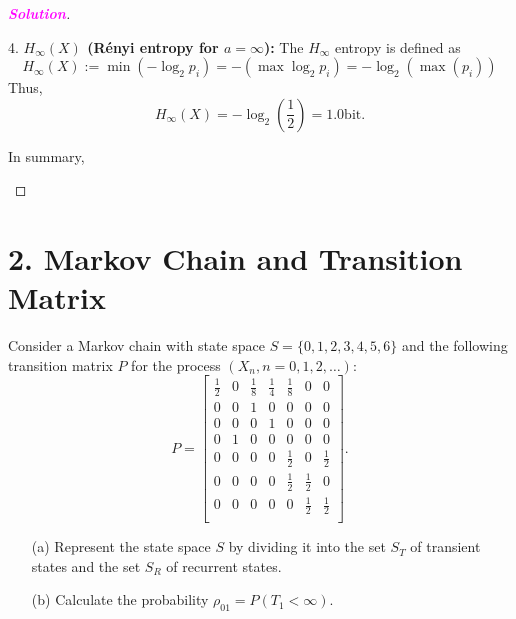 \documentclass[12pt,openany]{book}
\theoremstyle{definition}
\newcommand{\sol}{\textcolor{magenta}{\bf Solution}}
\begin{document}
\begin{proof}[\sol]
\begin{enumerate}[(a)]
		4. \textbf{\( H_{\infty}(X) \) (Rényi entropy for \( a = \infty \)):}
		The \( H_{\infty} \) entropy is defined as
		\[ H_{\infty}(X) :=\min(-\log_2 p_i)=-(\max \log_2 p_i)= -\log_2(\max(p_i)) \]
		Thus,
		\[ H_{\infty}(X) = -\log_2\left(\frac{1}{2}\right) = 1.0 \text{bit.} \]
	\end{enumerate}
	In summary, \begin{center}
	\end{center}
\end{proof}

\section*{2. Markov Chain and Transition Matrix}

Consider a Markov chain with state space \( S = \{0, 1, 2, 3, 4, 5, 6\} \) and the following transition matrix \( P \) for the process \( (X_n, n = 0, 1, 2, \ldots) \):
\[
P = \begin{bmatrix}
	\frac{1}{2} & 0 & \frac{1}{8} & \frac{1}{4} & \frac{1}{8} & 0 & 0 \\
	0 & 0 & 1 & 0 & 0 & 0 & 0 \\
	0 & 0 & 0 & 1 & 0 & 0 & 0 \\
	0 & 1 & 0 & 0 & 0 & 0 & 0 \\
	0 & 0 & 0 & 0 & \frac{1}{2} & 0 & \frac{1}{2} \\
	0 & 0 & 0 & 0 & \frac{1}{2} & \frac{1}{2} & 0 \\
	0 & 0 & 0 & 0 & 0 & \frac{1}{2} & \frac{1}{2} \\
\end{bmatrix}.
\]
\begin{itemize}
	\item[(a)] Represent the state space $S$ by dividing it into the set $S_T$ of transient states and the set $S_R$ of recurrent states.
	\item[(b)] Calculate the probability $\rho_{01} = P(T_1 < \infty)$.
\end{itemize}
\end{document}
